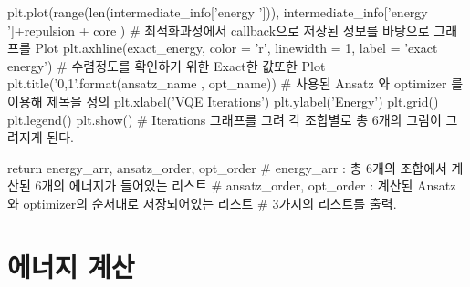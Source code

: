 \documentclass[11pt]{article}
\begin{document}
\begin{CodeBox}[title={Example: Python snippet}]
            plt.plot(range(len(intermediate_info['energy '])), intermediate_info['energy ']+repulsion + core )
            # 최적화과정에서 callback으로 저장된 정보를 바탕으로 그래프를 Plot
            plt.axhline(exact_energy, color = 'r', linewidth = 1, label = 'exact energy')
            # 수렴정도를 확인하기 위한 Exact한 값또한 Plot
            plt.title('{0},{1}'.format(ansatz_name , opt_name))
            # 사용된 Ansatz 와 optimizer 를 이용해 제목을 정의
            plt.xlabel('VQE Iterations')
            plt.ylabel('Energy')
            plt.grid()
            plt.legend()
            plt.show()
            # Iterations 그래프를 그려 각 조합별로 총 6개의 그림이 그려지게 된다. 
    
    return energy_arr, ansatz_order, opt_order
    # energy_arr : 총 6개의 조합에서 계산된 6개의 에너지가 들어있는 리스트 
    # ansatz_order, opt_order  : 계산된 Ansatz 와 optimizer의 순서대로 저장되어있는 리스트 
    # 3가지의 리스트를 출력. 
\end{CodeBox} 

\newpage

\section{에너지 계산}
\end{document}
